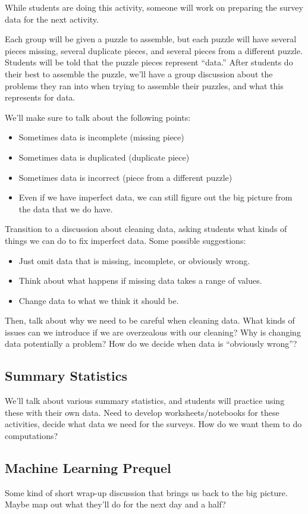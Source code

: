 \documentclass[11pt]{article}
\begin{document}
While students are doing this activity, someone will work on preparing the survey data for the next activity.

Each group will be given a puzzle to assemble, but each puzzle will have several pieces missing, several duplicate pieces, and several pieces from a different puzzle. Students will be told that the puzzle pieces represent ``data.'' After students do their best to assemble the puzzle, we'll have a group discussion about the problems they ran into when trying to assemble their puzzles, and what this represents for data.

We'll make sure to talk about the following points:
\begin{itemize}
\item Sometimes data is incomplete (missing piece)
\item Sometimes data is duplicated (duplicate piece)
\item Sometimes data is incorrect (piece from a different puzzle)
\item Even if we have imperfect data, we can still figure out the big picture from the data that we do have.
\end{itemize}

Transition to a discussion about cleaning data, asking students what kinds of things we can do to fix imperfect data. Some possible suggestions:
\begin{itemize}
\item Just omit data that is missing, incomplete, or obviously wrong.
\item Think about what happens if missing data takes a range of values.
\item Change data to what we think it should be.
\end{itemize}
Then, talk about why we need to be careful when cleaning data. What kinds of issues can we introduce if we are overzealous with our cleaning? Why is changing data potentially a problem? How do we decide when data is ``obviously wrong''?

\subsection*{Summary Statistics}

{\color{red} We'll talk about various summary statistics, and students will practice using these with their own data. Need to develop worksheets/notebooks for these activities, decide what data we need for the surveys. How do we want them to do computations?}

\subsection*{Machine Learning Prequel}

{\color{red} Some kind of short wrap-up discussion that brings us back to the big picture. Maybe map out what they'll do for the next day and a half?}
\end{document}
